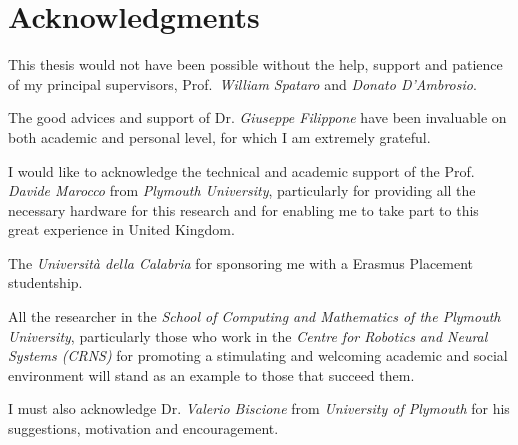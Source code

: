 \cleardoublepage
 \pagestyle{empty}
\setcounter{savepage}{\thepage}
\begin{abstractpage}

\end{abstractpage}



% 

\cleardoublepage

\section*{Acknowledgments}

This thesis would not have been possible without the help, support and patience
of my principal supervisors, Prof.~\textit{William Spataro}
and \textit{Donato D'Ambrosio}.

The good advices and support of Dr. \textit{Giuseppe Filippone} have been
invaluable on both  academic and  personal level, for which I am extremely grateful.



I would like to acknowledge the technical and academic support of the Prof.
\textit{Davide Marocco} from  \textit{Plymouth University}, particularly for
providing  all the necessary hardware for this research and for
enabling me to take part to this great experience in United Kingdom.

The \textit{Universit\`a della Calabria} for
sponsoring me with a Erasmus Placement studentship.

All the researcher in the \textit{School of Computing and Mathematics of the
Plymouth University}, particularly those who work in the \textit{Centre for
Robotics and Neural Systems (CRNS)} for promoting a stimulating and welcoming academic and
social environment will stand as an example to those that succeed them.

I must also acknowledge Dr. \textit{Valerio Biscione} from \textit{University
of Plymouth}  for his suggestions, motivation and  encouragement.\@



\newpage



